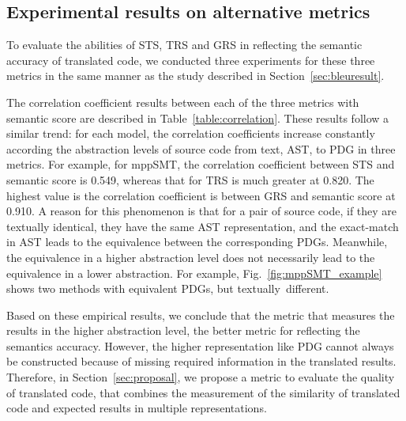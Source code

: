 \subsection{Experimental results on alternative metrics}


To evaluate the abilities of STS, TRS and GRS in reflecting the
semantic accuracy of translated code, we conducted three experiments
for these three metrics in the same manner as the study described in
Section~\ref{sec:bleuresult}.

The correlation coefficient results between each of the three metrics
with semantic score are described in
Table~\ref{table:correlation}. These results follow a similar trend:
for each model, the correlation coefficients increase constantly
according the abstraction levels of source code from text, AST, to PDG
in three metrics. For example, for mppSMT, the correlation
coefficient between  STS and semantic score is 0.549, whereas that
for TRS is much greater at 0.820. The highest value is the
correlation coefficient is between GRS and semantic score at 0.910. A
reason for this phenomenon is that for a pair of source code, if they
are textually identical, they have the same AST representation, and
the exact-match in AST leads to the equivalence between the
corresponding PDGs. Meanwhile, the equivalence in a higher
abstraction level does not necessarily lead to the equivalence in a
lower abstraction. For example, Fig.~\ref{fig:mppSMT_example} shows
two methods with equivalent PDGs, but textually~different.

Based on these empirical results, we conclude that the metric that
measures the results in the higher abstraction level, the better
metric for reflecting the semantics accuracy.  However, the higher
representation like PDG cannot always be constructed because of
missing required information in the translated results. Therefore, in
Section~\ref{sec:proposal}, we propose a metric to evaluate the
quality of translated code, that combines the measurement of the
similarity of translated code and expected results in multiple
representations.


